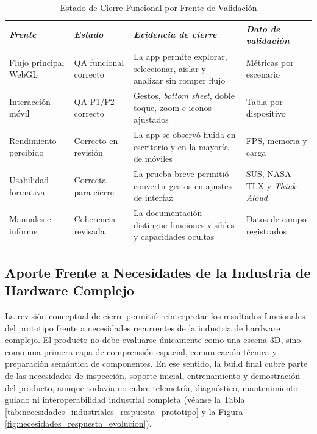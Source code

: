 \begin{table}[htbp]
    \caption{Estado de Cierre Funcional por Frente de Validación}
    \label{tab:estado_cierre_funcional}
    \begin{tabularx}{\textwidth}{p{2.8cm}p{2.8cm}Xp{2.4cm}}
        \hline
        \textit{Frente} & \textit{Estado} & \textit{Evidencia de cierre} & \textit{Dato de validación} \\ \hline
        Flujo principal WebGL & QA funcional correcto & La app permite explorar, seleccionar, aislar y analizar sin romper flujo & Métricas por escenario \\
        Interacción móvil & QA P1/P2 correcto & Gestos, \textit{bottom sheet}, doble toque, zoom e iconos ajustados & Tabla por dispositivo \\
        Rendimiento percibido & Correcto en revisión & La app se observó fluida en escritorio y en la mayoría de móviles & FPS, memoria y carga \\
        Usabilidad formativa & Correcta para cierre & La prueba breve permitió convertir gestos en ajustes de interfaz & SUS, NASA-TLX y \textit{Think-Aloud} \\
        Manuales e informe & Coherencia revisada & La documentación distingue funciones visibles y capacidades ocultas & Datos de campo registrados \\ \hline
    \end{tabularx}
\end{table}

\subsection{Aporte Frente a Necesidades de la Industria de Hardware Complejo}

La revisión conceptual de cierre permitió reinterpretar los resultados funcionales del prototipo frente a necesidades recurrentes de la industria de hardware complejo. El producto no debe evaluarse únicamente como una escena 3D, sino como una primera capa de comprensión espacial, comunicación técnica y preparación semántica de componentes. En ese sentido, la build final cubre parte de las necesidades de inspección, soporte inicial, entrenamiento y demostración del producto, aunque todavía no cubre telemetría, diagnóstico, mantenimiento guiado ni interoperabilidad industrial completa (véanse la Tabla \ref{tab:necesidades_industriales_respuesta_prototipo} y la Figura \ref{fig:necesidades_respuesta_evolucion}).

